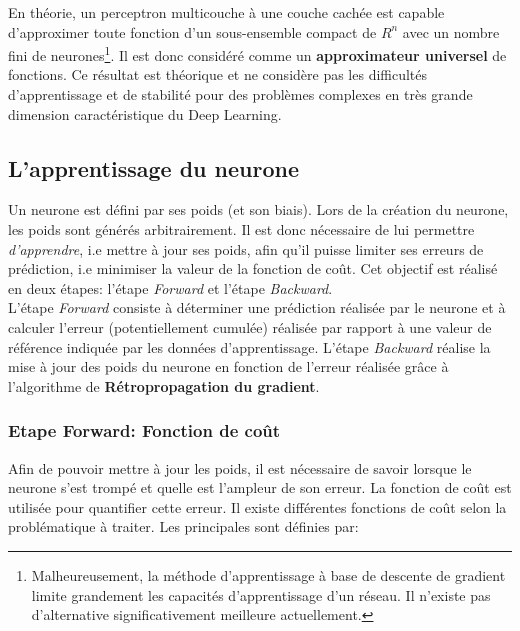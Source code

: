 \noindent En théorie, un perceptron multicouche à une couche cachée est capable d'approximer toute fonction d'un sous-ensemble compact de $R^n$ avec un nombre fini de neurones\footnote{Malheureusement, la méthode d'apprentissage à base de descente de gradient limite grandement les capacités d'apprentissage d'un réseau. Il n'existe pas d'alternative significativement meilleure actuellement.}. Il est donc considéré comme un \textbf{approximateur universel} de fonctions. Ce résultat est théorique et ne considère pas les difficultés d’apprentissage et de stabilité pour des problèmes complexes en très grande dimension caractéristique du Deep Learning.

\subsection{L'apprentissage du neurone}

\noindent Un neurone est défini par ses poids (et son biais). Lors de la création du neurone, les poids sont générés arbitrairement. Il est donc nécessaire de lui permettre \textit{d'apprendre}, i.e mettre à jour ses poids, afin qu'il puisse limiter ses erreurs de prédiction, i.e minimiser la valeur de la fonction de coût. Cet objectif est réalisé en deux étapes: l'étape \textit{Forward} et l'étape \textit{Backward}.\\

\noindent L'étape \textit{Forward} consiste à déterminer une prédiction réalisée par le neurone et à calculer l'erreur (potentiellement cumulée) réalisée par rapport à une valeur de référence indiquée par les données d'apprentissage. L'étape \textit{Backward} réalise la mise à jour des poids du neurone en fonction de l'erreur réalisée  grâce à l'algorithme de \textbf{Rétropropagation du gradient}.

\subsubsection{Etape Forward: Fonction de coût}
\label{fn_cout}
\noindent Afin de pouvoir mettre à jour les poids, il est nécessaire de savoir lorsque le neurone s'est trompé et quelle est l'ampleur de son erreur. La fonction de coût est utilisée pour quantifier cette erreur. Il existe différentes fonctions de coût selon la problématique à traiter. Les principales sont définies par:\\

